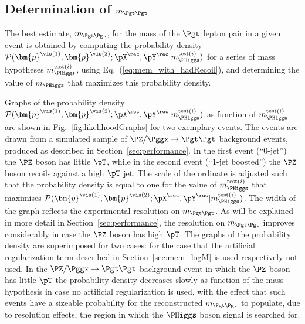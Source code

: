 \subsection{Determination of $m_{\Pgt\Pgt}$}
\label{sec:mem_numericalMaximization}

The best estimate, $m_{\Pgt\Pgt}$, for the mass of the $\Pgt$ lepton pair in a given event
is obtained by computing the probability density $\mathcal{P}(\bm{p}^{\vis(1)},\bm{p}^{\vis(2)};\pX^{\rec},\pY^{\rec}|m_{\PHiggs}^{\textrm{test}(i)})$ 
for a series of mass hypotheses $m_{\PHiggs}^{\textrm{test}(i)}$, using Eq.~(\ref{eq:mem_with_hadRecoil}), and determining the value of $m_{\PHiggs}$ that maximizes this probability density.

Graphs of the probability density $\mathcal{P}(\bm{p}^{\vis(1)},\bm{p}^{\vis(2)};\pX^{\rec},\pY^{\rec}|m_{\PHiggs}^{\textrm{test}(i)})$ 
as function of $m_{\PHiggs}^{\textrm{test}(i)}$ are shown in Fig.~\ref{fig:likelihoodGraphs} for two exemplary events.
The events are drawn from a simulated sample of $\PZ/\Pggx \to \Pgt\Pgt$ background events, produced as described in Section~\ref{sec:performance}.
In the first event (``$0$-jet'') the $\PZ$ boson has little $\pT$, while in the second event (``$1$-jet boosted'') the $\PZ$ boson recoils against a high $\pT$ jet.
The scale of the ordinate is adjusted such that the probability density is equal to one
for the value of $m_{\PHiggs}^{\textrm{test}(i)}$ that maximises $\mathcal{P}(\bm{p}^{\vis(1)},\bm{p}^{\vis(2)};\pX^{\rec},\pY^{\rec}|m_{\PHiggs}^{\textrm{test}(i)})$.
The width of the graph reflects the experimental resolution on $m_{\Pgt\Pgt}$.
As will be explained in more detail in Section~\ref{sec:performance}, the resolution on $m_{\Pgt\Pgt}$ improves considerably in case the $\PZ$ boson has high $\pT$.
The graphs of the probability density are superimposed for two cases:
for the case that the artificial regularization term described in Section~\ref{sec:mem_logM} is used respectively not used.
In the $\PZ/\Pggx \to \Pgt\Pgt$ background event in which the $\PZ$ boson has little $\pT$
the probability density decreases slowly as function of the mass hypothesis in case no artificial regularization is used,
with the effect that such events have a sizeable probability for the reconstructed $m_{\Pgt\Pgt}$ to populate, due to resolution effects, 
the region in which the $\PHiggs$ boson signal is searched for.

